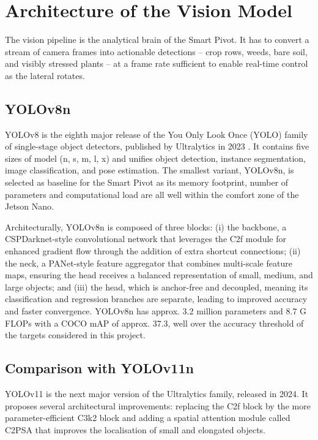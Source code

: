 \documentclass[12pt,a4paper]{report}
\begin{document}
\section{Architecture of the Vision Model}

The vision pipeline is the analytical brain of the Smart Pivot. It has to convert a stream of camera frames into actionable detections -- crop rows, weeds, bare soil, and visibly stressed plants -- at a frame rate sufficient to enable real-time control as the lateral rotates.

\subsection{YOLOv8n}

YOLOv8 is the eighth major release of the You Only Look Once (YOLO) family of single-stage object detectors, published by Ultralytics in 2023 . It contains five sizes of model (n, s, m, l, x) and unifies object detection, instance segmentation, image classification, and pose estimation. The smallest variant, YOLOv8n, is selected as baseline for the Smart Pivot as its memory footprint, number of parameters and computational load are all well within the comfort zone of the Jetson Nano.

Architecturally, YOLOv8n is composed of three blocks: (i) the backbone, a CSPDarknet-style convolutional network that leverages the C2f module for enhanced gradient flow through the addition of extra shortcut connections; (ii) the neck, a PANet-style feature aggregator that combines multi-scale feature maps, ensuring the head receives a balanced representation of small, medium, and large objects; and (iii) the head, which is anchor-free and decoupled, meaning its classification and regression branches are separate, leading to improved accuracy and faster convergence. YOLOv8n has approx. 3.2 million parameters and 8.7 G FLOPs with a COCO mAP of approx. 37.3, well over the accuracy threshold of the targets considered in this project.

\subsection{Comparison with YOLOv11n}

YOLOv11 is the next major version of the Ultralytics family, released in 2024. It proposes several architectural improvements: replacing the C2f block by the more parameter-efficient C3k2 block and adding a spatial attention module called C2PSA that improves the localisation of small and elongated objects.
\end{document}
